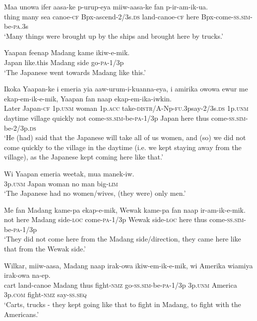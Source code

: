 \ea
\gll  Maa  unowa  ifer  aasa-ke  p-urup-eya  miiw-aasa-ke fan  p-ir-am-ik-ua.\\
thing  many  sea  canoe-\textsc{cf}  Bpx-ascend-2/3s.\textsc{ds}  land-canoe-\textsc{cf} here  Bpx-come-\textsc{ss}.\textsc{sim}-be-\textsc{pa}.3s\\ 
\glt ‘Many things were brought up by the ships and brought here by trucks.’ \\
\z


\ea
\gll  Yaapan  feenap  Madang  kame  ikiw-e-mik. \\
Japan  like.this  Madang  side  go-\textsc{pa}-1/3p \\
\glt ‘The Japanese went towards Madang like this.’ \\
\z


\ea
\gll  Ikoka  Yaapan-ke  i  emeria  yia  aaw-urum-i-kuanna-eya,  i  amirika  owowa  ewur  me ekap-em-ik-e-mik,  Yaapan  fan  naap  ekap-em-ika-iwkin. \\
Later  Japan-\textsc{cf}  1p.\textsc{unm}  woman  1p.\textsc{acc}  take-\textsc{distr}/A-Np-\textsc{fu}.3psay-2/3s.\textsc{ds}  1p.\textsc{unm}  daytime  village  quickly  not come-\textsc{ss}.\textsc{sim}-be-\textsc{pa}-1/3p  Japan  here  thus  come-\textsc{ss}.\textsc{sim}-be-2/3p.\textsc{ds} \\
\glt ‘He (had) said that the Japanese will take all of us women, and (so) we did not come quickly to the village in the daytime (i.e. we kept staying away from the village), as the Japanese kept coming here like that.’ \\
\z


\ea
\gll  Wi  Yaapan  emeria  weetak,  mua  manek-iw. \\
3p.\textsc{unm}  Japan  woman  no  man  big-\textsc{lim} \\
\glt ‘The Japanese had no women/wives, (they were) only men.’ \\
\z


\ea
\gll  Me  fan  Madang  kame-pa  ekap-e-mik, Wewak  kame-pa  fan  naap  ir-am-ik-e-mik. \\
not  here  Madang  side-\textsc{loc}  come-\textsc{pa}-1/3p Wewak  side-\textsc{loc}  here  thus  come-\textsc{ss}.\textsc{sim}-be-\textsc{pa}-1/3p\\ 
\glt ‘They did not come here from the Madang side/direction, they came here like that from the Wewak side.’ \\
\z


\ea
\gll  Wilkar,  miiw-aasa,  Madang  naap  irak-owa  ikiw-em-ik-e-mik, wi  Amerika  wiamiya  irak-owa  na-ep. \\
cart  land-canoe  Madang  thus  fight-\textsc{nmz}  go-\textsc{ss}.\textsc{sim}-be-\textsc{pa}-1/3p 3p.\textsc{unm}  America  3p.\textsc{com}  fight-\textsc{nmz}  say{}-\textsc{ss.seq}\\ 
\glt ‘Carts, trucks - they kept going like that to fight in Madang, to fight with the Americans.’ \\
\z


